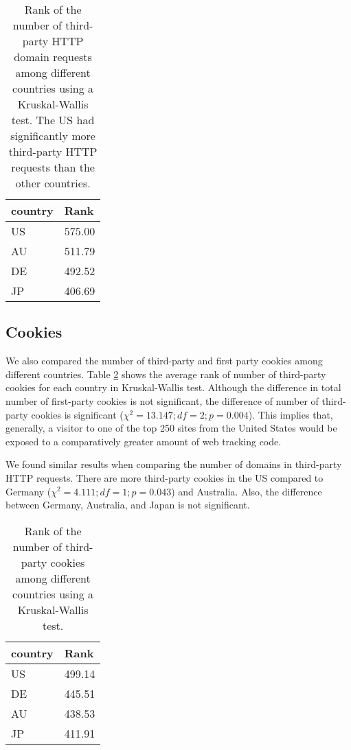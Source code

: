 \documentclass[conference]{IEEEtran}
\begin{document}
\begin{table}[t]
\centering
\caption{Rank of the number of third-party HTTP domain requests among different countries using a Kruskal-Wallis test. The US had significantly more third-party HTTP requests than the other countries.}
\label{thirdHTTP}
\begin{tabular}{|l|l|}
\hline
\textbf{country} & \textbf{Rank} \\ \hline
US               & 575.00        \\ \hline
AU               & 511.79        \\ \hline
DE               & 492.52        \\ \hline
JP               & 406.69        \\ \hline
\end{tabular}
\end{table}

\subsection{Cookies}
We also compared the number of third-party and first party cookies among different countries. 
Table \ref{thirdcookie} shows the average rank of number of third-party cookies for each country in Kruskal-Wallis test. Although the difference in total number of first-party cookies is not significant, the difference of number of third-party cookies is significant ($\chi^{2}=13.147; df=2; p=0.004$). This implies that, generally, a visitor to one of the top 250 sites from the United States would be exposed to a comparatively greater amount of web tracking code.

We found similar results when comparing the number of domains in third-party HTTP requests. There are more third-party cookies in the US compared to Germany ($\chi^{2} = 4.111; df=1; p=0.043$) and Australia. Also, the difference between Germany, Australia, and Japan is not significant.

\begin{table}[t]
\centering
\caption{Rank of the number of third-party cookies among different countries using a Kruskal-Wallis test.}
\label{thirdcookie}
\begin{tabular}{|l|l|}
\hline
\textbf{country} & \textbf{Rank} \\ \hline
US               & 499.14        \\ \hline
DE               & 445.51        \\ \hline
AU               & 438.53        \\ \hline
JP               & 411.91        \\ \hline
\end{tabular}
\end{table}
\end{document}
